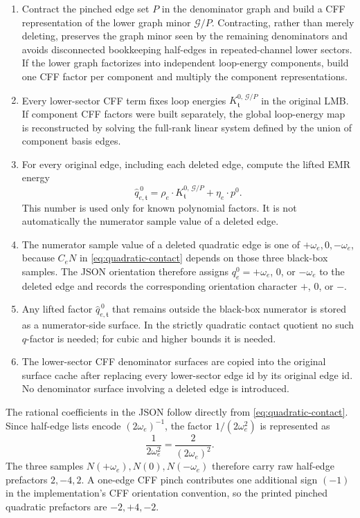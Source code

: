 \documentclass[11pt,a4paper]{report}
\newcommand{\Graph}{\mathcal G}
\begin{document}
\begin{enumerate}[leftmargin=2em]
  \item Contract the pinched edge set \(P\) in the denominator graph and build
        a CFF representation of the lower graph minor \(\Graph/P\).  Contracting,
        rather than merely deleting, preserves the graph minor seen by the
        remaining denominators and avoids disconnected bookkeeping half-edges in
        repeated-channel lower sectors.  If the lower graph factorizes into
        independent loop-energy components, build one CFF factor per component
        and multiply the component representations.
  \item Every lower-sector CFF term fixes loop energies
        \(K_{\mathfrak t}^{0,\,\Graph/P}\) in the original LMB.  If
        component CFF factors were built separately, the global loop-energy map
        is reconstructed by solving the full-rank linear system defined by the
        union of component basis edges.
  \item For every original edge, including each deleted edge, compute the
        lifted EMR energy
        \begin{equation}
          \widehat q_{e,\mathfrak t}^{\,0}
          =
          \rho_e\cdot K_{\mathfrak t}^{0,\,\Graph/P}
          +\eta_e\cdot p^0 .
          \label{eq:lifted-deleted-edge-energy}
        \end{equation}
        This number is used only for known polynomial factors.  It is not
        automatically the numerator sample value of a deleted edge.
  \item The numerator sample value of a deleted quadratic edge is one of
        \(+\omega_e,0,-\omega_e\), because
        \(C_eN\) in \eqref{eq:quadratic-contact} depends on those three
        black-box samples.  The JSON orientation therefore assigns
        \(q_e^0=+\omega_e\), \(0\), or \(-\omega_e\) to the deleted edge and
        records the corresponding orientation character \(+\), \(0\), or \(-\).
  \item Any lifted factor \(\widehat q_{e,\mathfrak t}^{\,0}\) that remains
        outside the black-box numerator is stored as a numerator-side surface.
        In the strictly quadratic contact quotient no such \(q\)-factor is
        needed; for cubic and higher bounds it is needed.
  \item The lower-sector CFF denominator surfaces are copied into the original
        surface cache after replacing every lower-sector edge id by its
        original edge id.  No denominator surface involving a deleted edge is
        introduced.
\end{enumerate}
The rational coefficients in the JSON follow directly from
\eqref{eq:quadratic-contact}.  Since half-edge lists encode
\((2\omega_e)^{-1}\), the factor \(1/(2\omega_e^2)\) is represented as
\[
  \frac{1}{2\omega_e^2}
  =
  \frac{2}{(2\omega_e)^2}.
\]
The three samples \(N(+\omega_e),N(0),N(-\omega_e)\) therefore carry raw
half-edge prefactors \(2,-4,2\).  A one-edge CFF pinch contributes one
additional sign \((-1)\) in the implementation's CFF orientation convention, so
the printed pinched quadratic prefactors are \(-2,+4,-2\).
\end{document}
